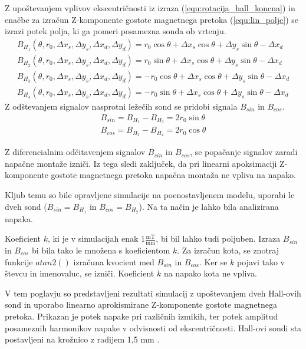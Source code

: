 Z upoštevanjem vplivov ekscentričnosti iz izraza (\ref{equ:rotacija_hall_koncna}) in enačbe za izračun Z-komponente gostote magnetnega pretoka (\ref{equ:lin_polje}) se izrazi potek polja, ki ga pomeri posamezna sonda ob vrtenju.
\begin{eqnarray}
\label{equ:lin_potek_sin}
B_{H_1}(\theta, r_0, \Delta x_s, \Delta y_s, \Delta x_d, \Delta y_d)=  r_0 \cos \theta + \Delta x_s \cos \theta+ \Delta y_s \sin \theta -\Delta x_d\\
\label{equ:lin_potek_cos}
B_{H_2}(\theta, r_0, \Delta x_s, \Delta y_s, \Delta x_d, \Delta y_d)= r_0 \sin \theta + \Delta x_s \cos \theta+ \Delta y_s \sin \theta -\Delta x_d\\
B_{H_3}(\theta, r_0, \Delta x_s, \Delta y_s, \Delta x_d, \Delta y_d)=  -r_0 \cos \theta + \Delta x_s \cos \theta+ \Delta y_s \sin \theta -\Delta x_d\\
\label{equ:lin_potek_zadnja}
B_{H_4}(\theta, r_0, \Delta x_s, \Delta y_s, \Delta x_d, \Delta y_d)=-r_0 \sin \theta + \Delta x_s \cos \theta+ \Delta y_s \sin \theta -\Delta x_d
\end{eqnarray}
Z odštevanjem signalov nasprotni ležečih sond se pridobi signala  $B_{sin}$ in $B_{cos}$.
\begin{eqnarray}
B_{sin}=  B_{H_1} - B_{H_3} = 2 r_0 \sin \theta \\
B_{cos}=  B_{H_2} - B_{H_4}=  2 r_0 \cos \theta
\end{eqnarray}

Z diferencialnim odčitavenjem signalov  $B_{sin}$ in $B_{cos}$, se popačanje signalov zaradi napačne montaže izniči. Iz tega sledi zaključek, da pri linearni apoksimaciji Z-komponente gostote magnetnega pretoka napačna montaža ne vpliva na napako.

Kljub temu so bile opravljene simulacije na poenostavljenem modelu, uporabi le dveh sond
 ($B_{sin}=B_{H_1}$ in $B_{cos}=B_{H_2}$). Na ta način je lahko bila analizirana napaka.
 
 Koeficient $k$, ki je v simulacijah enak $1 \frac{\mathrm{ mT}}{\mathrm{ mm}}$, bi bil lahko tudi poljuben.
 Izraza $B_{sin}$ in $B_{cos}$ bi bila tako le množena s koeficientom $k$. Za izračun kota, se znotraj funkcije $atan2()$ izračuna kvocient med $B_{sin}$ in $B_{cos}$. Ker se $k$ pojavi tako v števcu in imenovaluc, se izniči. Koeficient $k$ na napako kota ne vpliva.

V tem poglavju so predstavljeni rezultati simulacij z upoštevanjem dveh Hall-ovih sond in uporabo linearno aprokismirane Z-komponente gostote magnetnega pretoka.
Prikazan je potek napake pri različnih izmikih, ter potek amplitud posameznih harmonikov napake v odvisnosti od ekscentričnosti.
Hall-ovi sondi sta postavljeni na krožnico z radijem 1,5 mm \cite{AM8192}.
